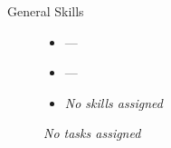 \subsubsection{}

\begin{multicols}{2}

    \raggedcolumns

    \begin{description}
    \item [General Skills] \hfill
        \begin{itemize}
        \item {}---
        \end{itemize}

    \label{skill:\VAR{ task.category|label_form }-\VAR{ task.evolution|label_form }-\VAR{ task.name|label_form }}
    \item [] 
        \begin{itemize}
        \item {}---
        \item \emph{No skills assigned}
        \end{itemize}
    \item [] \emph{No tasks assigned}
    \end{description}
\end{multicols}
